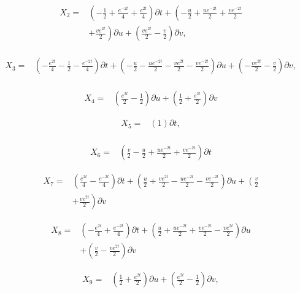 \begin{align*}
X_{2}=&\left(- \frac{1}{2}+\frac{e^{- 2 t}}{4}+\frac{e^{2 t}}{4} \right)\partial t+\left(- \frac{u}{2}+\frac{u e^{- 2 t}}{2}+\frac{v e^{- 2 t}}{2}\right.\\
&+\left.\frac{v e^{2 t}}{2} \right)\partial u+\left(\frac{v e^{2 t}}{2} - \frac{v}{2} \right)\partial v,\\
\end{align*}

\begin{align*}
X_{3}=&\left(- \frac{e^{2 t}}{4} - \frac{1}{2} - \frac{e^{- 2 t}}{4} \right)\partial t+\left(- \frac{u}{2} - \frac{u e^{- 2 t}}{2} - \frac{v e^{2 t}}{2} - \frac{v e^{- 2 t}}{2} \right)\partial u+\left(- \frac{v e^{2 t}}{2} - \frac{v}{2} \right)\partial v,\\
\end{align*}

\begin{align*}
X_{4}=&\left(\frac{e^{2 t}}{2} - \frac{1}{2} \right)\partial u+\left(\frac{1}{2}+\frac{e^{2 t}}{2} \right)\partial v
\end{align*}

\begin{align*}
X_{5}=&\left(1 \right)\partial t,\\
\end{align*}

\begin{align*}
X_{6}=&\left(\frac{v}{2}- \frac{u}{2}+\frac{u e^{- 2 t}}{2}+\frac{v e^{- 2 t}}{2} \right)\partial t
\end{align*}

\begin{align*}
X_{7}=&\left(\frac{e^{2 t}}{4} - \frac{e^{- 2 t}}{4} \right)\partial t+\left(\frac{u}{2}+\frac{v e^{2 t}}{2}- \frac{u e^{- 2 t}}{2}- \frac{v e^{- 2 t}}{2} \right)\partial u+\left(\frac{v}{2}\right.\\
&+\left.\frac{v e^{2 t}}{2} \right)\partial v
\end{align*}

\begin{align*}
X_{8}=&\left(- \frac{e^{2 t}}{4}+\frac{e^{- 2 t}}{4} \right)\partial t+\left(\frac{u}{2}+\frac{u e^{- 2 t}}{2}+\frac{v e^{- 2 t}}{2}- \frac{v e^{2 t}}{2} \right)\partial u\\
&+\left(\frac{v}{2}- \frac{v e^{2 t}}{2} \right)\partial v
\end{align*}

\begin{align*}
X_{9}=&\left(\frac{1}{2}+\frac{e^{2 t}}{2} \right)\partial u+\left(\frac{e^{2 t}}{2} - \frac{1}{2} \right)\partial v,\\
\end{align*}

